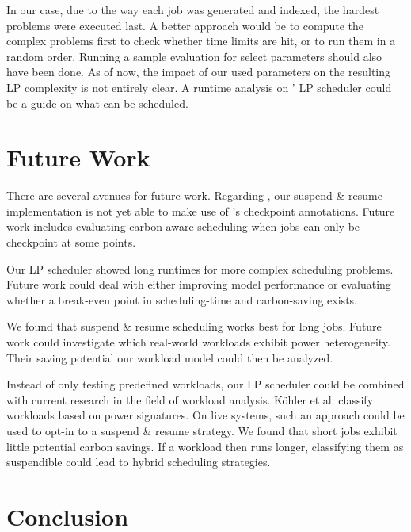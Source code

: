 In our case, due to the way each job was generated and indexed, the hardest problems were executed last. 
A better approach would be to compute the complex problems first to check whether time limits are hit, or to run them in a random order.
Running a sample evaluation for select parameters should also have been done.
As of now, the impact of our used parameters on the resulting LP complexity is not entirely clear.
A runtime analysis on \programname{}' LP scheduler could be a guide on what can be scheduled.

\section{Future Work} \label{sec:future_work}

There are several avenues for future work.
Regarding \programname{}, our suspend \& resume implementation is not yet able to make use of \modelname{}'s checkpoint annotations. Future work includes evaluating carbon-aware scheduling when jobs can only be checkpoint at some points.

Our LP scheduler showed long runtimes for more complex scheduling problems.
Future work could deal with either improving model performance  or evaluating whether a break-even point in scheduling-time and carbon-saving exists.

We found that suspend \& resume scheduling works best for long jobs.
Future work could investigate which real-world workloads exhibit power heterogeneity.
Their saving potential our workload model could then be analyzed.

Instead of only testing predefined workloads, our LP scheduler could be combined with current research in the field of workload analysis. 
Köhler et al. \cite{kohler_recognizing_2021} classify workloads based on power signatures. 
On live systems, such an approach could be used to opt-in to a suspend \& resume strategy. 
We found that short jobs exhibit little potential carbon savings. 
If a workload then runs longer, classifying them as suspendible could lead to hybrid scheduling strategies.  

\section{Conclusion}

